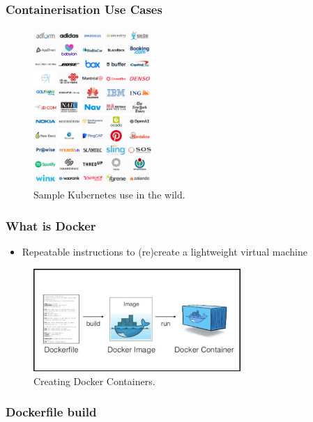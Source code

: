 \documentclass{beamer}
\begin{document}
  \begin{frame}
    \frametitle{Containerisation Use Cases}
    \begin{figure}[th!]
      \centering
      \includegraphics[width=0.4\textwidth]{kube_case_studies.png}
      \caption{Sample Kubernetes use in the wild. \autocite{kube_cases}}
      \label{fig:kube_use}
    \end{figure}
  \end{frame}

  \begin{frame}
    \frametitle{What is Docker}
    \begin{itemize}
        \item Repeatable instructions to (re)create a lightweight virtual machine
    \end{itemize}
    \begin{figure}[th!]
      \centering
      \includegraphics[width=0.7\textwidth]{docker_process.png}
      \caption{Creating Docker Containers. \autocite{docker_build}}
      \label{fig:docker_build}
    \end{figure}
  \end{frame}

  \begin{frame}
    \frametitle{Dockerfile build}

  \end{frame}
\end{document}
